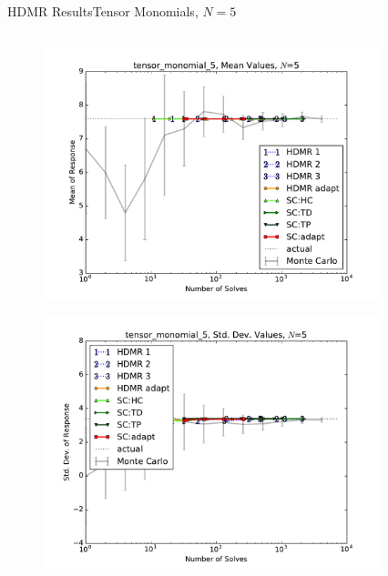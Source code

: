 \documentclass{beamer}
\begin{document}
\begin{frame}{HDMR Results}{Tensor Monomials, $N=5$}\vspace{-20pt}
 \begin{columns}
   \begin{column}{0.5\textwidth}
        \begin{figure}[h!]
          \centering
          \includegraphics[width=0.8\linewidth]{anlmodels/tensor_monomial_5_mean_vals}
        \end{figure}
        \vspace{-20pt}
        \begin{figure}[h!]
          \centering
          \includegraphics[width=0.8\linewidth]{anlmodels/tensor_monomial_5_var_vals}
        \end{figure}
   \end{column}
   \begin{column}{0.5\textwidth}
        \begin{figure}[h!]
          \centering

\end{figure}
\end{column}
\end{columns}
\end{frame}
\end{document}
